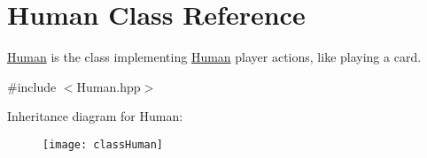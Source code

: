 \hypertarget{classHuman}{\section{Human Class Reference}
\label{classHuman}
}


\hyperlink{classHuman}{Human} is the class implementing \hyperlink{classHuman}{Human} player actions, like playing a card.  




{\ttfamily \#include $<$Human.\-hpp$>$}

Inheritance diagram for Human\-:\begin{figure}[H]
\begin{center}
\leavevmode
\texttt{[image: classHuman]}
\end{center}
\end{figure}
